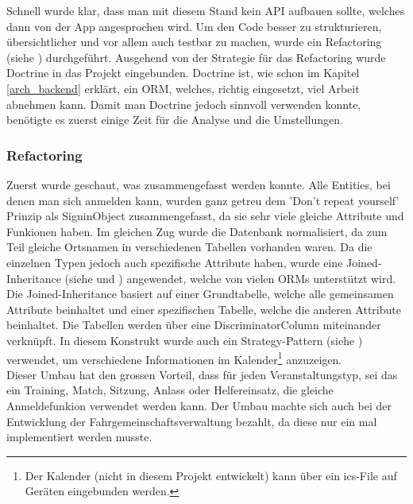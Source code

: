 Schnell wurde klar, dass man mit diesem Stand kein API aufbauen sollte, welches dann von der App angesprochen wird. Um den Code besser zu strukturieren, übersichtlicher und vor allem auch testbar zu machen, wurde ein Refactoring (siehe \cite{feathers2004working}) durchgeführt. Ausgehend von der Strategie für das Refactoring wurde Doctrine in das Projekt eingebunden. Doctrine ist, wie schon im Kapitel \ref{arch_backend} erklärt, ein ORM, welches, richtig eingesetzt, viel Arbeit abnehmen kann. Damit man Doctrine jedoch sinnvoll verwenden konnte, benötigte es zuerst einige Zeit für die Analyse und die Umstellungen.

\subsubsection{Refactoring}
Zuerst wurde geschaut, was zusammengefasst werden konnte. Alle Entities, bei denen man sich anmelden kann, wurden ganz getreu dem 'Don’t repeat yourself' Prinzip als SigninObject zusammengefasst, da sie sehr viele gleiche Attribute und Funkionen haben. Im gleichen Zug wurde die Datenbank normalisiert, da zum Teil gleiche Ortsnamen in verschiedenen Tabellen vorhanden waren. Da die einzelnen Typen jedoch auch spezifische Attribute haben, wurde eine Joined-Inheritance (siehe \cite{inheritance_java} und \cite{inheritance_doctrine}) angewendet, welche von vielen ORMs unterstützt wird. Die Joined-Inheritance basiert auf einer Grundtabelle, welche alle gemeinsamen Attribute beinhaltet und einer spezifischen Tabelle, welche die anderen Attribute beinhaltet. Die Tabellen werden über eine DiscriminatorColumn miteinander verknüpft. In diesem Konstrukt wurde auch ein Strategy-Pattern (siehe \cite{gof_book}) verwendet, um verschiedene Informationen im Kalender\footnote{Der Kalender (nicht in diesem Projekt entwickelt) kann über ein ics-File auf Geräten eingebunden werden.} anzuzeigen.\\

Dieser Umbau hat den grossen Vorteil, dass für jeden Veranstaltungstyp, sei das ein Training, Match, Sitzung, Anlass oder Helfereinsatz, die gleiche Anmeldefunkion verwendet werden kann. Der Umbau machte sich auch bei der Entwicklung der Fahrgemeinschaftsverwaltung bezahlt, da diese nur ein mal implementiert werden musste.\\


